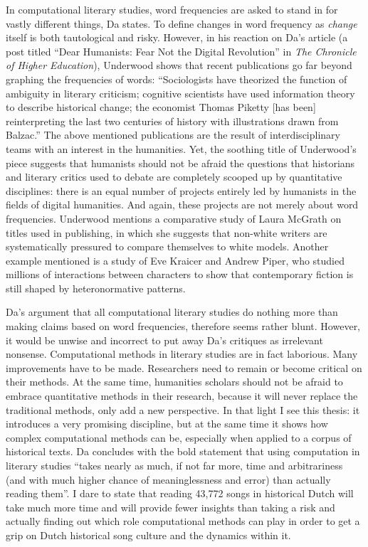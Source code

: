 \noindent In computational literary studies, word frequencies are asked to stand in for vastly different things, Da states. To define changes in word frequency as \textit{change} itself is both tautological and risky.\autocite[614]{da_computational_2019} However, in his reaction on Da's article (a post titled \enquote{Dear Humanists: Fear Not the Digital Revolution} in \textit{The Chronicle of Higher Education}), Underwood shows that recent publications go far beyond graphing the frequencies of words: \enquote{Sociologists have theorized the function of ambiguity in literary criticism; cognitive scientists have used information theory to describe historical change; the economist Thomas Piketty [has been] reinterpreting the last two centuries of history with illustrations drawn from Balzac.} \autocite{underwood_dear_2019} The above mentioned publications are the result of interdisciplinary teams with an interest in the humanities. Yet, the soothing title of Underwood's piece suggests that humanists should not be afraid the questions that historians and literary critics used to debate are completely scooped up by quantitative disciplines: there is an equal number of projects entirely led by humanists in the fields of digital humanities. And again, these projects are not merely about word frequencies. Underwood mentions a comparative study of Laura McGrath on titles used in publishing, in which she suggests that non-white writers are systematically pressured to compare themselves to white models. Another example mentioned is a study of Eve Kraicer and Andrew Piper, who studied millions of interactions between characters to show that contemporary fiction is still shaped by heteronormative patterns.\autocite{underwood_dear_2019}

Da's argument that all computational literary studies do nothing more than making claims based on word frequencies, therefore seems rather blunt. However, it would be unwise and incorrect to put away Da's critiques as irrelevant nonsense. Computational methods in literary studies are in fact laborious. Many improvements have to be made. Researchers need to remain or become critical on their methods. At the same time, humanities scholars should not be afraid to embrace quantitative methods in their research, because it will never replace the traditional methods, only add a new perspective. In that light I see this thesis: it introduces a very promising discipline, but at the same time it shows how complex computational methods can be, especially when applied to a corpus of historical texts. Da concludes with the bold statement that using computation in literary studies \enquote{takes nearly as much, if not far more, time and arbitrariness (and with much higher chance of meaninglessness and error) than actually reading them}.\autocite[638]{da_computational_2019} I dare to state that reading 43,772 songs in historical Dutch will take much more time and will provide fewer insights than taking a risk and actually finding out which role computational methods can play in order to get a grip on Dutch historical song culture and the dynamics within it.

